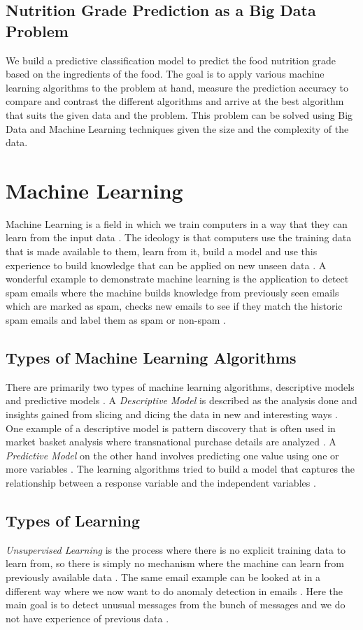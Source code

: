 \documentclass[sigconf]{acmart}
\begin{document}
\subsection{Nutrition Grade Prediction as a Big Data Problem}
We build a predictive classification model to predict the food nutrition grade based on the ingredients of the food. The goal is to apply various machine learning algorithms to the problem at hand, measure the prediction accuracy to compare and contrast the different algorithms and arrive at the best algorithm that suits the given data and the problem. This problem can be solved using Big Data and Machine Learning techniques given the size and the complexity of the data.

\section{Machine Learning}
Machine Learning is a field in which we train computers in a way that they can learn from the input data \cite{book-shai}. The ideology is that computers use the training data that is made available to them, learn from it, build a model and use this experience to build knowledge that can be applied on new unseen data \cite{book-shai}. A wonderful example to demonstrate machine learning is the application to detect spam emails where the machine builds knowledge from previously seen emails which are marked as spam, checks new emails to see if they match the historic spam emails and label them as spam or non-spam \cite{book-shai}. 

\subsection{Types of Machine Learning Algorithms}
There are primarily two types of machine learning algorithms, descriptive models and predictive models \cite{book-shai}. A {\em Descriptive Model} is described as the analysis done and insights gained from slicing and dicing the data in new and interesting ways \cite{book-shai}. One example of a descriptive model is pattern discovery that is often used in market basket analysis where transnational purchase details are analyzed \cite{book-shai}. A {\em Predictive Model} on the other hand involves predicting one value using one or more variables \cite{book-shai}. The learning algorithms tried to build a model that captures the relationship between a response variable and the independent variables \cite{book-tan}.

\subsection{Types of Learning}
{\em Unsupervised Learning} is the process where there is no explicit training data to learn from, so there is simply no mechanism where the machine can learn from previously available data \cite{book-shai}. The same email example can be looked at in a different way where we now want to do anomaly detection in emails \cite{book-shai}. Here the main goal is to detect unusual messages from the bunch of messages and we do not have experience of previous data \cite{book-shai}. \\
\end{document}
